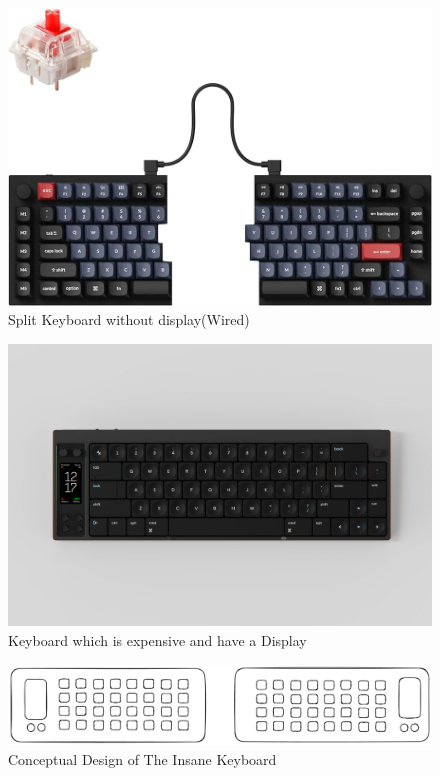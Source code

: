 \documentclass[a4paper,11pt]{article}%
\begin{document}
\begin{figure}[!h]
    \centering
    \includegraphics[scale=0.55]{figures/split_keyboard.jpg}
    \caption{Split Keyboard without display(Wired)}
\end{figure}
\vspace{0.2cm}
\begin{figure}[H]
    \centering
    \includegraphics[scale=0.2]{figures/nomad.jpg}
    \caption{Keyboard which is expensive and have a Display}
\end{figure}
\vspace{0.2cm}

\begin{figure}[H]
    \centering
    \includegraphics[scale=0.38]{figures/concept.png}
    \caption{Conceptual Design of The Insane Keyboard}
\end{figure}
\vspace{0.2cm}
\end{document}
